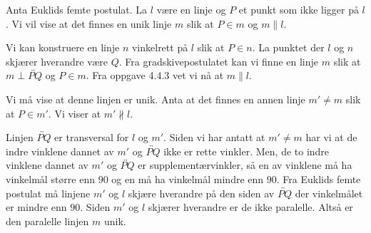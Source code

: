 \begin{oppgave}[4.7.1]
    Anta Euklids femte postulat. La $l$ være en linje og $P$ et punkt som ikke ligger på $l$. 
    Vi vil vise at det finnes en unik linje $m$ slik at $P\in m$ og $m\parallel l$. 

    Vi kan konstruere en linje $n$ vinkelrett på $l$ slik at $P\in n$. 
    La punktet der $l$ og $n$ skjærer hverandre være $Q$. 
    Fra gradskivepostulatet kan vi finne en linje $m$ slik at $m\perp \overleftrightarrow{PQ}$ og $P\in m$. 
    Fra oppgave 4.4.3 vet vi nå at $m\parallel l$. 

    Vi må vise at denne linjen er unik. 
    Anta at det finnes en annen linje $m'\neq m$ slik at $P\in m'$. 
    Vi viser at $m' \nparallel l$. 

    Linjen $\overleftrightarrow{PQ}$ er transversal for $l$ og $m'$. 
    Siden vi har antatt at $m'\neq m$ har vi at de indre vinklene dannet av $m'$ og $\overleftrightarrow{PQ}$ ikke er rette vinkler. 
    Men, de to indre vinklene dannet av $m'$ og $\overleftrightarrow{PQ}$ er supplementærvinkler, så en av vinklene må ha vinkelmål større enn $90$ og en må ha vinkelmål mindre enn $90$.
    Fra Euklids femte postulat må linjene $m'$ og $l$ skjære hverandre på den siden av $\overleftrightarrow{PQ}$ der vinkelmålet er mindre enn $90$. 
    Siden $m'$ og $l$ skjærer hverandre er de ikke paralelle. Altså er den paralelle linjen $m$ unik. 

    \begin{figure}[H]
        \centering
        
    \end{figure}
\end{oppgave}
